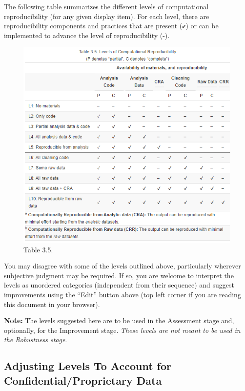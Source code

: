 \documentclass[
  openany]{book}
\begin{document}
The following table summarizes the different levels of computational reproducibility (for any given display item). For each level, there are reproducibility components and practices that are present (\texttt{✔}) or can be implemented to advance the level of reproducibility (-).

\begin{figure}
\centering
\includegraphics{docs/Table_LevelsOfComputationalReproducibility.png}
\caption{Table 3.5.}
\end{figure}

You may disagree with some of the levels outlined above, particularly wherever subjective judgment may be required. If so, you are welcome to interpret the levels as unordered categories (independent from their sequence) and suggest improvements using the ``Edit'' button above (top left corner if you are reading this document in your browser).

\textbf{Note:} The levels suggested here are to be used in the Assessment stage and, optionally, for the Improvement stage. \emph{These levels are not meant to be used in the Robustness stage}.

\hypertarget{adjusting-levels-to-account-for-confidentialproprietary-data}{%
\subsection{Adjusting Levels To Account for Confidential/Proprietary Data}\label{adjusting-levels-to-account-for-confidentialproprietary-data}}
\end{document}
